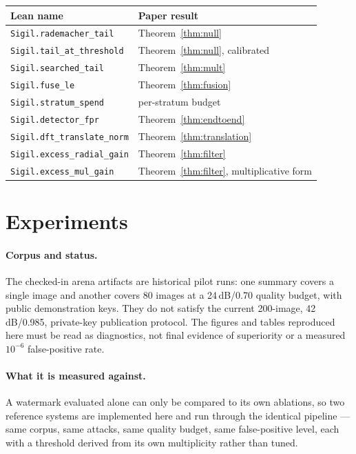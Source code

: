 \documentclass[10pt,twocolumn]{article}
\theoremstyle{definition}
\theoremstyle{remark}
\newcommand{\lean}[1]{\texttt{#1}}
\begin{document}
\begin{center}
\small
\begin{tabular}{ll}
\toprule
Lean name & Paper result \\
\midrule
\lean{Sigil.rademacher\_tail}    & Theorem~\ref{thm:null} \\
\lean{Sigil.tail\_at\_threshold} & Theorem~\ref{thm:null}, calibrated \\
\lean{Sigil.searched\_tail}      & Theorem~\ref{thm:mult} \\
\lean{Sigil.fuse\_le}            & Theorem~\ref{thm:fusion} \\
\lean{Sigil.stratum\_spend}      & per-stratum budget \\
\lean{Sigil.detector\_fpr}       & Theorem~\ref{thm:endtoend} \\
\lean{Sigil.dft\_translate\_norm}& Theorem~\ref{thm:translation} \\
\lean{Sigil.excess\_radial\_gain}& Theorem~\ref{thm:filter} \\
\lean{Sigil.excess\_mul\_gain}   & Theorem~\ref{thm:filter}, multiplicative form \\
\bottomrule
\end{tabular}
\end{center}

\section{Experiments}
\label{sec:experiments}

\paragraph{Corpus and status.} The checked-in arena artifacts are historical
pilot runs: one summary covers a single image and another covers 80 images at a
24\,dB/0.70 quality budget, with public demonstration keys. They do not satisfy
the current 200-image, 42\,dB/0.985, private-key publication protocol. The
figures and tables reproduced here must be read as diagnostics, not final
evidence of superiority or a measured $10^{-6}$ false-positive rate.

\paragraph{What it is measured against.} A watermark evaluated alone can only be
compared to its own ablations, so two reference systems are implemented here and
run through the identical pipeline --- same corpus, same attacks, same quality
budget, same false-positive level, each with a threshold derived from its own
multiplicity rather than tuned.
\end{document}
